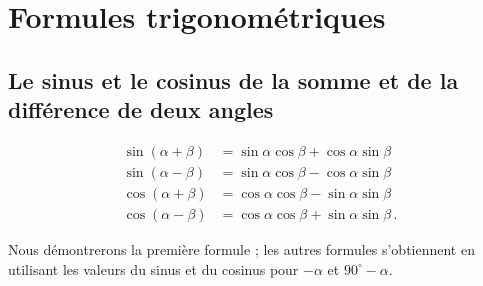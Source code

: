 
\section{Formules trigonométriques}\label{a.trig-identities}



\subsection{Le sinus et le cosinus de la somme et de la différence de deux angles} \label{s.sum-of-trig}

\begin{theorem}\label{thm.sum-of-trig}
\begin{align*}
\sin(\alpha+\beta) &= \sin\alpha\cos\beta + \cos\alpha\sin\beta\\
\sin(\alpha-\beta) &= \sin\alpha\cos\beta - \cos\alpha\sin\beta\\
\cos(\alpha+\beta) &= \cos\alpha\cos\beta - \sin\alpha\sin\beta\\
\cos(\alpha-\beta) &= \cos\alpha\cos\beta + \sin\alpha\sin\beta\,.
\end{align*}
\end{theorem}
Nous démontrerons la première formule ; les autres formules s'obtiennent en utilisant les valeurs du sinus et du cosinus pour $-\alpha$ et $90^\circ-\alpha$.

